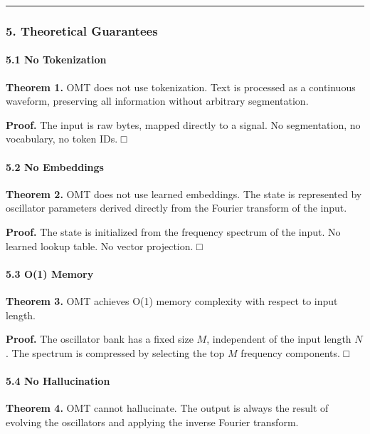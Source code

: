 \documentclass[
  11pt,
  a4paper,
]{article}
\begin{document}
\begin{center}\rule{0.5\linewidth}{0.5pt}\end{center}

\subsubsection{5. Theoretical
Guarantees}\label{theoretical-guarantees-2}

\paragraph{5.1 No Tokenization}\label{no-tokenization}

\textbf{Theorem 1.} OMT does not use tokenization. Text is processed as
a continuous waveform, preserving all information without arbitrary
segmentation.

\textbf{Proof.} The input is raw bytes, mapped directly to a signal. No
segmentation, no vocabulary, no token IDs. □

\paragraph{5.2 No Embeddings}\label{no-embeddings}

\textbf{Theorem 2.} OMT does not use learned embeddings. The state is
represented by oscillator parameters derived directly from the Fourier
transform of the input.

\textbf{Proof.} The state is initialized from the frequency spectrum of
the input. No learned lookup table. No vector projection. □

\paragraph{5.3 O(1) Memory}\label{o1-memory-1}

\textbf{Theorem 3.} OMT achieves O(1) memory complexity with respect to
input length.

\textbf{Proof.} The oscillator bank has a fixed size \(M\), independent
of the input length \(N\). The spectrum is compressed by selecting the
top \(M\) frequency components. □

\paragraph{5.4 No Hallucination}\label{no-hallucination-1}

\textbf{Theorem 4.} OMT cannot hallucinate. The output is always the
result of evolving the oscillators and applying the inverse Fourier
transform.
\end{document}
